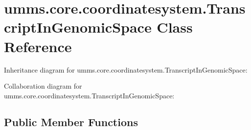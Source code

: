 \hypertarget{classumms_1_1core_1_1coordinatesystem_1_1_transcript_in_genomic_space}{\section{umms.\+core.\+coordinatesystem.\+Transcript\+In\+Genomic\+Space Class Reference}
\label{classumms_1_1core_1_1coordinatesystem_1_1_transcript_in_genomic_space}
}


Inheritance diagram for umms.\+core.\+coordinatesystem.\+Transcript\+In\+Genomic\+Space\+:


Collaboration diagram for umms.\+core.\+coordinatesystem.\+Transcript\+In\+Genomic\+Space\+:
\subsection*{Public Member Functions}
